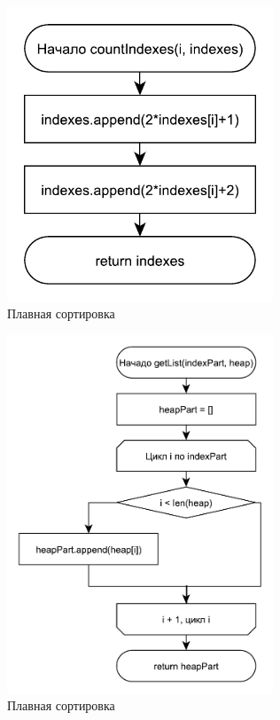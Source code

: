 \documentclass[12pt,a4paper]{scrartcl}
\begin{document}
\begin{figure}[h!]
	\centering
	\includegraphics[width=300px]{33.pdf}
	\caption{Плавная сортировка}
	\label{graph2.7}
\end{figure}

\begin{figure}[h!]
	\centering
	\includegraphics[width=300px]{34.pdf}
	\caption{Плавная сортировка}
	\label{graph2.8}
\end{figure}
\end{document}
